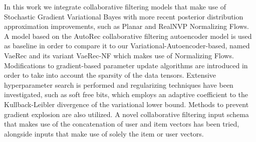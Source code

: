 In this work we integrate collaborative filtering models that make use of Stochastic Gradient
Variational Bayes with more recent posterior distribution approximation improvements,
such as Planar and RealNVP Normalizing Flows.
A model based on the AutoRec collaborative filtering autoencoder model is 
used as baseline in order to compare it to our Variational-Autoencoder-based, named VaeRec and
its variant VaeRec-NF which makes use of Normalizing Flows.
Modifications to gradient-based parameter update algorithms are introduced
in order to take into account the sparsity of the data tensors.
Extensive hyperparameter search is performed and regularizing techniques have been investigated, such as soft free bits, which employs an adaptive
coefficient to the Kullback-Leibler divergence of the variational lower bound.
Methods to prevent gradient explosion are also utilized.
A novel collaborative filtering input schema that makes use of the concatenation of user 
and item vectors has been tried, 
alongside inputs that make use of solely the item or user vectors.
